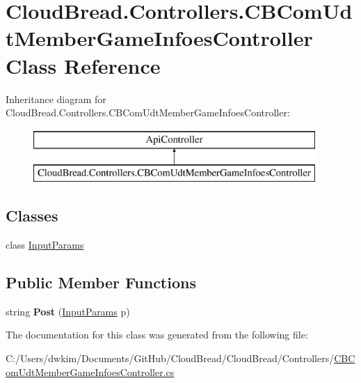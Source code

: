 \hypertarget{class_cloud_bread_1_1_controllers_1_1_c_b_com_udt_member_game_infoes_controller}{}\section{Cloud\+Bread.\+Controllers.\+C\+B\+Com\+Udt\+Member\+Game\+Infoes\+Controller Class Reference}
\label{class_cloud_bread_1_1_controllers_1_1_c_b_com_udt_member_game_infoes_controller}
Inheritance diagram for Cloud\+Bread.\+Controllers.\+C\+B\+Com\+Udt\+Member\+Game\+Infoes\+Controller\+:\begin{figure}[H]
\begin{center}
\leavevmode
\includegraphics[height=2.000000cm]{class_cloud_bread_1_1_controllers_1_1_c_b_com_udt_member_game_infoes_controller}
\end{center}
\end{figure}
\subsection*{Classes}
\begin{DoxyCompactItemize}
\item 
class \hyperlink{class_cloud_bread_1_1_controllers_1_1_c_b_com_udt_member_game_infoes_controller_1_1_input_params}{Input\+Params}
\end{DoxyCompactItemize}
\subsection*{Public Member Functions}
\begin{DoxyCompactItemize}
\item 
string {\bfseries Post} (\hyperlink{class_cloud_bread_1_1_controllers_1_1_c_b_com_udt_member_game_infoes_controller_1_1_input_params}{Input\+Params} p)\hypertarget{class_cloud_bread_1_1_controllers_1_1_c_b_com_udt_member_game_infoes_controller_a0de30889beff91cef76eac04ed1acf98}{}\label{class_cloud_bread_1_1_controllers_1_1_c_b_com_udt_member_game_infoes_controller_a0de30889beff91cef76eac04ed1acf98}

\end{DoxyCompactItemize}


The documentation for this class was generated from the following file\+:\begin{DoxyCompactItemize}
\item 
C\+:/\+Users/dwkim/\+Documents/\+Git\+Hub/\+Cloud\+Bread/\+Cloud\+Bread/\+Controllers/\hyperlink{_c_b_com_udt_member_game_infoes_controller_8cs}{C\+B\+Com\+Udt\+Member\+Game\+Infoes\+Controller.\+cs}\end{DoxyCompactItemize}
